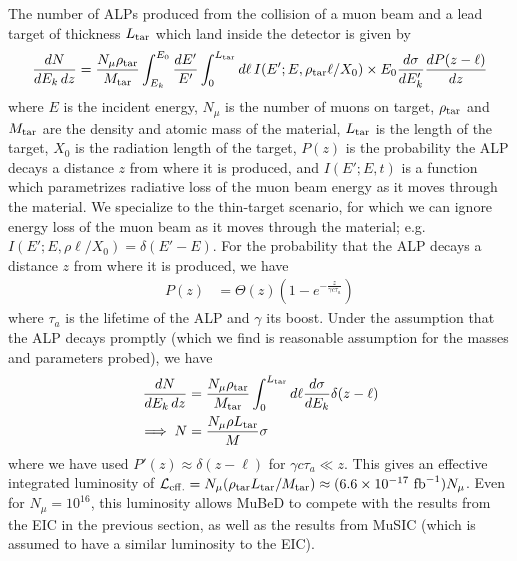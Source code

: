 The number of ALPs produced from the collision of a muon beam and a lead target of thickness $L_{\rm tar}$ which land inside the detector is given by \cite{Bjorken:2009mm,Cesarotti:2023sje}
\begin{align}
    \frac{dN}{dE_k\,dz} = \frac{N_\mu \rho_{\rm tar}}{M_{\rm tar}}\int_{E_k}^{E_0}{\frac{dE'}{E'}\int_0^{L_{\rm tar}} d\ell\,I(E'; E, \rho_{\rm tar}\ell/X_0)\times E_0\frac{d\sigma}{dE_k'}\frac{dP(z-\ell)}{dz}}
\end{align}
where $E$ is the incident energy, $N_\mu$ is the number of muons on target, $\rho_{\rm tar}$ and $M_{\rm tar}$ are the density and atomic mass of the material, $L_{\rm tar}$ is the length of the target, $X_0$ is the radiation length of the target, $P(z)$ is the probability the ALP decays a distance $z$ from where it is produced, and $I(E'; E, t)$ is a function which parametrizes radiative loss of the muon beam energy as it moves through the material. We specialize to the thin-target scenario, for which we can ignore energy loss of the muon beam as it moves through the material; e.g. $I(E'; E, \rho\ell/X_0) = \delta(E' - E)$. For the probability that the ALP decays a distance $z$ from where it is produced, we have
\begin{align}
    P(z) &= \Theta(z) \left(1-e^{-\frac{z}{\gamma c \tau_a}}\right)
\end{align}
where $\tau_a$ is the lifetime of the ALP and $\gamma$ its boost. Under the assumption that the ALP decays promptly (which we find is reasonable assumption for the masses and parameters probed), we have 
\begin{align}
    \frac{dN}{dE_k\,dz} &= \frac{N_\mu \rho_{\rm tar}}{M_{\rm tar}}\int_0^{L_{\rm tar}} d\ell\frac{d\sigma}{dE_k}\delta(z - \ell)\nonumber \\
    \implies N &= \frac{N_\mu \rho L_{\rm tar}}{M}\sigma
\end{align}
where we have used $P'(z) \approx \delta(z-\ell)$ for $\gamma c\tau_a \ll z$. This gives an effective integrated luminosity of ${\cal L}_{\rm eff.} = N_\mu (\rho_{\rm tar} L_{\rm tar}/M_{\rm tar})\approx (6.6\times 10^{-17}~{\rm fb}^{-1}) N_\mu$. Even for $N_\mu = 10^{16}$, this luminosity allows MuBeD to compete with the results from the EIC in the previous section, as well as the results from MuSIC (which is assumed to have a similar luminosity to the EIC). 

